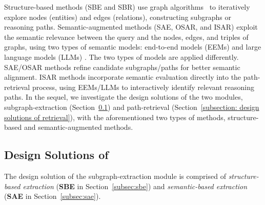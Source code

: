 Structure-based methods (SBE and SBR) use graph algorithms~\cite{Korf1985DepthFirstIA,ThunderRW,FastRWR,FastPPR,Topppr,PPRSurvey} to iteratively explore nodes (entities) and edges (relations), %
constructing subgraphs or reasoning paths.
Semantic-augmented methods (SAE, OSAR, and ISAR) exploit the semantic relevance between the query and the nodes, edges, and triples of graphs, using two types of semantic models: end-to-end models (EEMs) {\cite{reimers-2019-sentence-bert,reimers-2020-multilingual-sentence-bert,thakur-2020-AugSBERT}} and large language models (LLMs) {\cite{LLMSurvey,ToG,GraphInsight}}. 
The two types of models are applied differently. 
SAE/OSAR methods refine candidate subgraphs/paths for better semantic alignment.
ISAR methods incorporate semantic evaluation directly into the path-retrieval process, using EEMs/LLMs to interactively identify relevant reasoning paths.
In the sequel, we investigate the design solutions of the two modules, subgraph-extraction (Section~\ref{subsection: design solutions of preretrieval}) and path-retrieval (Section~\ref{subsection: design solutions of retrieval}), with the aforementioned two types of methods, structure-based and semantic-augmented methods.
%

\vspace{-5pt}
\subsection{Design Solutions of {\PreRetrieval}}
\label{subsection: design solutions of preretrieval}

The design solution of the subgraph-extraction module is comprised of \textit{structure-based extraction} (\textbf{SBE} in Section~\ref{subsec:sbe}) and \textit{semantic-based extraction} (\textbf{SAE} in Section~\ref{subsec:sae}).

\vspace{-5pt}
